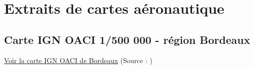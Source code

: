 \section{Extraits de cartes aéronautique}
\subsection{Carte IGN OACI 1/500 000 - région Bordeaux}
\hyperlink{ignOaciBordeaux.1}{Voir la carte IGN OACI de Bordeaux} (Source : \cite{img:ignOaciBordeaux})


